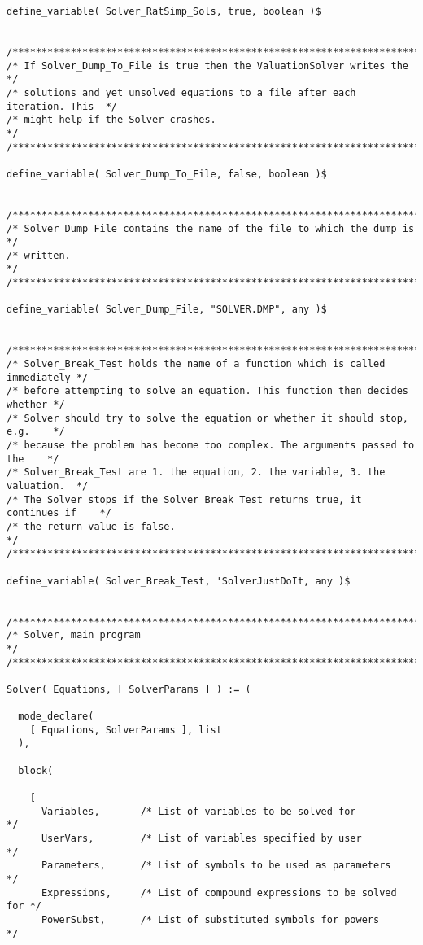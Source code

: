 \begin{verbatim}
define_variable( Solver_RatSimp_Sols, true, boolean )$


/******************************************************************************/
/* If Solver_Dump_To_File is true then the ValuationSolver writes the         */
/* solutions and yet unsolved equations to a file after each iteration. This  */
/* might help if the Solver crashes.                                          */
/******************************************************************************/

define_variable( Solver_Dump_To_File, false, boolean )$


/******************************************************************************/
/* Solver_Dump_File contains the name of the file to which the dump is        */
/* written.                                                                   */
/******************************************************************************/

define_variable( Solver_Dump_File, "SOLVER.DMP", any )$


/******************************************************************************/
/* Solver_Break_Test holds the name of a function which is called immediately */
/* before attempting to solve an equation. This function then decides whether */
/* Solver should try to solve the equation or whether it should stop, e.g.    */
/* because the problem has become too complex. The arguments passed to the    */
/* Solver_Break_Test are 1. the equation, 2. the variable, 3. the valuation.  */
/* The Solver stops if the Solver_Break_Test returns true, it continues if    */
/* the return value is false.                                                 */
/******************************************************************************/

define_variable( Solver_Break_Test, 'SolverJustDoIt, any )$


/******************************************************************************/
/* Solver, main program                                                       */
/******************************************************************************/

Solver( Equations, [ SolverParams ] ) := (

  mode_declare(
    [ Equations, SolverParams ], list
  ),

  block(

    [
      Variables,       /* List of variables to be solved for            */
      UserVars,        /* List of variables specified by user           */
      Parameters,      /* List of symbols to be used as parameters      */
      Expressions,     /* List of compound expressions to be solved for */
      PowerSubst,      /* List of substituted symbols for powers        */


\end{verbatim}
